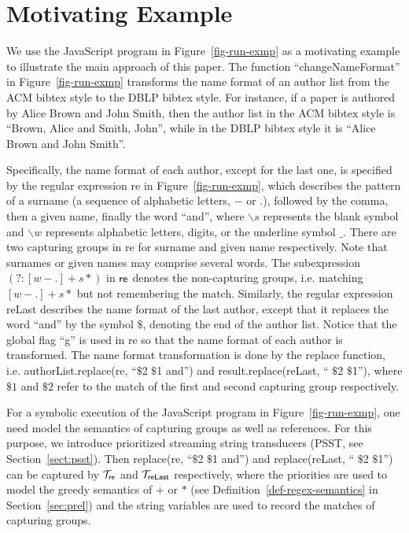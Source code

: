 
\section{Motivating Example}\label{sec:mot}

We use the JavaScript program in Figure~\ref{fig-run-exmp} as a motivating example to illustrate the main approach of this paper. 
The function ``changeNameFormat''  in Figure~\ref{fig-run-exmp} transforms the name format of an author list from the ACM bibtex style to the DBLP bibtex style. For instance,  if a paper is authored by Alice Brown and John Smith, then the author list in the ACM bibtex style is ``Brown, Alice and Smith, John'', while  in the DBLP bibtex style it is ``Alice Brown and John Smith''. 

Specifically,  the name format of each author, except for the last one, is specified by the regular expression {\sf re}  in Figure~\ref{fig-run-exmp}, which describes the pattern of a surname (a sequence of alphabetic letters, $-$ or $.$), followed by the comma, then a given name, finally the word ``and'', where $\backslash s$ represents the blank symbol and $\backslash w$ represents alphabetic letters, digits, or the underline symbol $\_$. There are two capturing groups in {\sf re}  for surname and  given name respectively. Note that surnames or given names may comprise several words. The subexpression $(?: [w-.]+s*)$ in ${\sf re}$ denotes the non-capturing groups, i.e. matching $[w-.]+s*$ but not remembering the match.
Similarly, the regular expression {\sf reLast} describes the name format of the last author, except that it replaces the word ``and'' by the symbol $\$$, denoting the end of the author list. Notice that the global flag ``g'' is used in {\sf re} so that the name format of each author is transformed. The name format transformation is done by the {\sf replace} function, i.e. {\sf authorList.replace(re, ``$\$$2 $\$$1 and'')} and  {\sf result.replace(reLast, `` $\$$2 $\$$1'')}, where $\$1$ and $\$2$ refer to the match of the first and second capturing group respectively. 

For a symbolic execution of the JavaScript program in Figure~\ref{fig-run-exmp}, one need model the semantics of capturing groups as well as references. For this purpose, we introduce prioritized streaming string transducers (PSST, see Section~\ref{sect:psst}). Then {\sf replace(re, ``$\$$2 $\$$1 and'')} and {\sf replace(reLast, `` $\$$2 $\$$1'')} can be captured by $\mathcal{T}_{\sf re}$ and $\mathcal{T}_{\sf reLast}$ respectively, where the priorities are used to model the greedy semantics of $+$ or $*$ (see Definition~\ref{def-regex-semantics} in Section~\ref{sec:prel}) and the string variables are used to record the matches of capturing groups.

